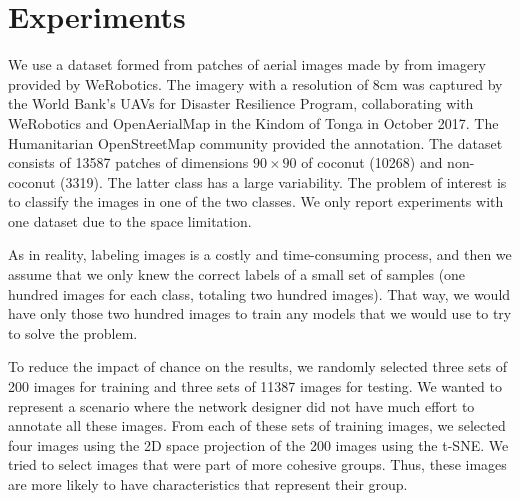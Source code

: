 \documentclass[a4paper,conference]{IEEEtran}
\begin{document}
\section{Experiments}
We use a dataset formed from patches of aerial images made by \cite{8899005} from imagery provided by WeRobotics. The imagery with a resolution of 8cm was captured by the World Bank's UAVs for Disaster Resilience Program, collaborating with WeRobotics and OpenAerialMap in the Kindom of Tonga in October 2017. The Humanitarian OpenStreetMap community provided the annotation. The dataset consists of 13587 patches of dimensions $90 \times 90$ of coconut (10268) and non-coconut (3319). The latter class has a large variability. The problem of interest is to classify the images in one of the two classes. We only report experiments with one dataset due to the space limitation.

As in reality, labeling images is a costly and time-consuming process, and then we assume that we only knew the correct labels of a small set of samples (one hundred images for each class, totaling two hundred images). That way, we would have only those two hundred images to train any models that we would use to try to solve the problem.

To reduce the impact of chance on the results, we randomly selected three sets of 200 images for training and three sets of 11387 images for testing. We wanted to represent a scenario where the network designer did not have much effort to annotate all these images. From each of these sets of training images, we selected four images using the 2D space projection of the 200 images using the t-SNE. We tried to select images that were part of more cohesive groups. Thus, these images are more likely to have characteristics that represent their group.
\end{document}
